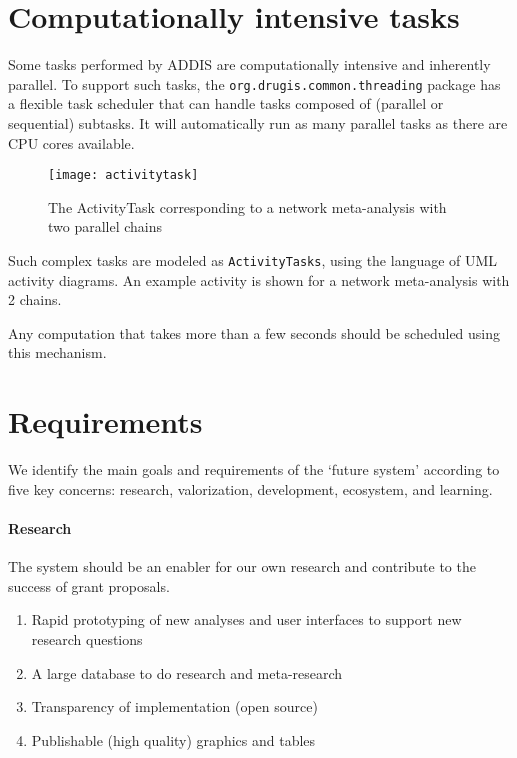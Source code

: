 \documentclass[a4paper]{article}
\begin{document}
\section{Computationally intensive tasks}

Some tasks performed by ADDIS are computationally intensive and inherently parallel.
To support such tasks, the {\tt org.drugis.common.threading} package has a flexible task scheduler that can handle tasks composed of (parallel or sequential) subtasks.
It will automatically run as many parallel tasks as there are CPU cores available.

\begin{figure}[h]
\centering
\texttt{[image: activitytask]}
\caption{The ActivityTask corresponding to a network meta-analysis with two parallel chains}
\end{figure}

Such complex tasks are modeled as {\tt ActivityTasks}, using the language of UML activity diagrams.
An example activity is shown for a network meta-analysis with 2 chains.

Any computation that takes more than a few seconds should be scheduled using this mechanism.

\clearpage

\appendix

\section{Requirements}

We identify the main goals and requirements of the `future system' according to five key concerns: research, valorization, development, ecosystem, and learning.

\paragraph{Research}
The system should be an enabler for our own research and contribute to the success of grant proposals.
\begin{enumerate}[label=R\arabic*]
\item\label{rPrototyping} Rapid prototyping of new analyses and user interfaces to support new research questions
\item\label{rDatabase} A large database to do research and meta-research
\item\label{rTransparency} Transparency of implementation (open source)
\item\label{rPublishable} Publishable (high quality) graphics and tables 
\end{enumerate}
\end{document}

